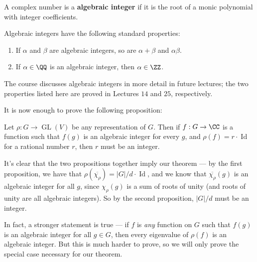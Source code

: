 
\begin{definition}
    A complex number is a \textbf{algebraic integer} if it is the root of a monic polynomial with integer coefficients. 
\end{definition}

\begin{lemma}
    Algebraic integers have the following standard properties:
    \begin{enumerate}[label=(\alph*)]
        \item If $\alpha$ and $\beta$ are algebraic integers, so are $\alpha + \beta$ and $\alpha\beta$. 
        \item If $\alpha \in \QQ$ is an algebraic integer, then $\alpha \in \ZZ$. 
    \end{enumerate}
\end{lemma}

The course discusses algebraic integers in more detail in future lectures; the two properties listed here are proved in Lectures $14$ and $25$, respectively.  

It is now enough to prove the following proposition:

\begin{proposition}
    Let $\rho : G \to \operatorname{GL}(V)$ be any representation of $G$. Then if $f : G \to \CC$ is a function such that $f(g)$ is an algebraic integer for every $g$, and $\rho(f) = r\cdot \operatorname{Id}$ for a rational number $r$, then $r$ must be an integer. 
\end{proposition}

It's clear that the two propositions together imply our theorem --- by the first proposition, we have that $\rho(\overline{\chi_\rho}) = |G|/d\cdot \operatorname{Id}$, and we know that $\overline{\chi_\rho}(g)$ is an algebraic integer for all $g$, since $\chi_\rho(g)$ is a sum of roots of unity (and roots of unity are all algebraic integers). So by the second proposition, $|G|/d$ must be an integer. 

In fact, a stronger statement is true --- if $f$ is \emph{any} function on $G$ such that $f(g)$ is an algebraic integer for all $g \in G$, then every eigenvalue of $\rho(f)$ is an algebraic integer. But this is much harder to prove, so we will only prove the special case necessary for our theorem.

